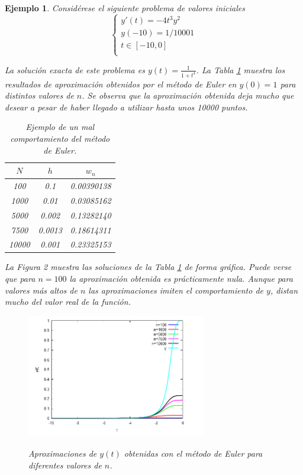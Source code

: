 \documentclass{article}
\theoremstyle{theorem-style}  %
\theoremstyle{definition-style}
\theoremstyle{example-style}
\newtheorem{example}{Ejemplo}[section]
\begin{document}
	\begin{example} \label{ej:motivacion}
		Considérese el siguiente problema de valores iniciales
		\begin{equation*}
			\begin{cases}
			y'(t) = -4 t^3 y^2 \\
			y(-10) = 1/10001 \\
			t \in [-10,0] \\
			\end{cases}
		\end{equation*}

		La solución exacta de este problema es $y(t)=\frac{1}{1+t^4}$. La Tabla \ref{table:euler} muestra los resultados de aproximación obtenidos por el método de Euler en $y(0) = 1$ para distintos valores de $n$. Se observa que la aproximación obtenida deja mucho que desear a pesar de haber llegado a utilizar hasta unos 10000 puntos.

		\begin{table}[H]
			\centering
			\begin{tabular}{|| c | c | c ||}
				\hline
				\hline $N$ &  $h$ & $w_n$ \\
				\hline 100 & 0.1 & 0.00390138 \\
				\hline 1000 & 0.01 & 0.03085162 \\
				\hline 5000 & 0.002 & 0.13282140 \\
				\hline 7500 & 0.0013 & 0.18614311 \\
				\hline 10000 & 0.001 & 0.23325153 \\
				\hline
				\hline
			\end{tabular}
			\caption{Ejemplo de un mal comportamiento del método de Euler.}
			\label{table:euler}
		\end{table}

		La Figura 2 muestra las soluciones de la Tabla \ref{table:euler} de forma gráfica. Puede verse que para $n=100$ la aproximación obtenida es prácticamente nula. Aunque para valores más altos de $n$ las aproximaciones imiten el comportamiento de $y$, distan mucho del valor real de la función.

		\begin{figure}[H]
			\centering
			\includegraphics[width=0.7\textwidth]{./Images/eulermaxima.png}
			\label{fig:euler}
			\caption{Aproximaciones de $y(t)$ obtenidas con el método de Euler para diferentes valores de $n$.}
		\end{figure}
	\end{example}
\end{document}

